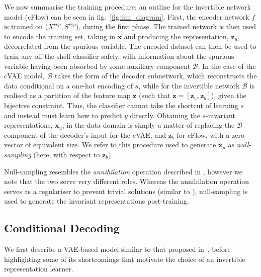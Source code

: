 We now summarise the training procedure; an outline for the invertible network model (cFlow) can be seen in fig.~\ref{fig:inn_diagram}.
First, the encoder network $f$ is trained on ($X^\mathit{rep}, S^\mathit{rep}$), during the first phase.
The trained network is then used to encode the training set,
taking in $\bm{x}$ and producing the representation, $\bm{z}_u$, decorrelated from the spurious variable.
The encoded dataset can then be used to train any off-the-shelf classifier safely, with information about the spurious variable having been absorbed by some auxiliary component $\mathcal{B}$.
In the case of the \acf{cVAE} model,
$\mathcal{B}$ takes the form of the decoder subnetwork, which reconstructs the data conditional on a one-hot encoding of $s$,
while for the invertible network $\mathcal{B}$ is realised as a partition of the feature map $\bm{z}$
(such that $\bm{z} = [\bm{z}_u, \bm{z}_b]$), given the bijective constraint.
Thus, the classifier cannot take the shortcut of learning $s$ and instead must learn how to predict $y$ directly.
Obtaining the $s$-invariant representations, $\bm{x}_u$, in the data domain
is simply a matter of replacing the $\mathcal{B}$ component of the decoder's input for the cVAE,
and $\bm{z}_b$ for cFlow, with a zero vector of equivalent size.
We refer to this procedure used to generate $\bm{x}_u$ as \emph{null-sampling} (here, with respect to $\bm{z}_b)$.

Null-sampling resembles the \emph{annihilation} operation described in \citet{xiao2017dna}, however we note that the two serve very different roles.  Whereas the annihilation operation serves as a regulariser to prevent trivial solutions (similar to \cite{jaiswal2018unsupervised}), null-sampling is used to generate the invariant representations post-training.

\subsection{Conditional Decoding}%
\label{conddec}
\noindent We first describe a VAE-based model similar to that proposed in~\citet{madras2018learning}, before highlighting some of its shortcomings that motivate the choice of an invertible representation learner.

